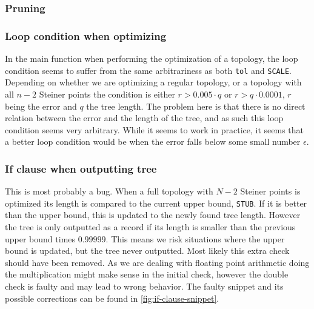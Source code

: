 
\subsubsection{Pruning}
\label{sec:pruning}


\subsubsection{Loop condition when optimizing}
\label{sec:loop-condition-when-1}

In the main function when performing the optimization of a topology, the loop
condition seems to suffer from the same arbitrariness as both \texttt{tol} and
\texttt{SCALE}. Depending on whether we are optimizing a regular topology, or a
topology with all $n-2$ Steiner points the condition is either $r > 0.005 \cdot
q$ or $r > q \cdot 0.0001$, $r$ being the error and $q$ the tree length. The
problem here is that there is no direct relation between the error and the
length of the tree, and as such this loop condition seems very arbitrary. While
it seems to work in practice, it seems that a better loop condition would be
when the error falls below some small number $\epsilon$.

\subsubsection{If clause when outputting tree}
\label{sec:if-clause-when}

This is most probably a bug. When a full topology with $N-2$ Steiner points is
optimized its length is compared to the current upper bound, \texttt{STUB}. If
it is better than the upper bound, this is updated to the newly found tree
length. However the tree is only outputted as a record if its length is smaller
than the previous upper bound times $0.99999$. This means we risk situations
where the upper bound is updated, but the tree never outputted. Most likely
this extra check should have been removed. As we are dealing with floating
point arithmetic doing the multiplication might make sense in the initial check,
however the double check is faulty and may lead to wrong behavior. The faulty
snippet and its possible corrections can be found in \cref{fig:if-clause-snippet}.

